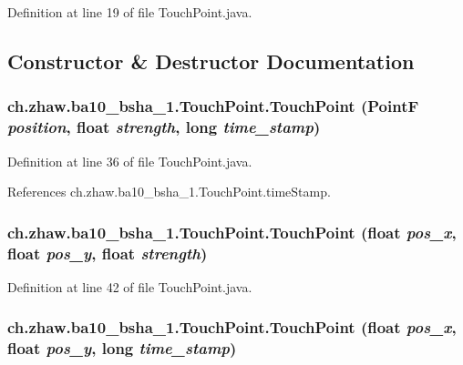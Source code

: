 Definition at line 19 of file TouchPoint.java.

\subsection{Constructor \& Destructor Documentation}
\hypertarget{classch_1_1zhaw_1_1ba10__bsha__1_1_1TouchPoint_a78cfb1506a0081d1e3175fde400290de}{
\subsubsection[{TouchPoint}]{\setlength{\rightskip}{0pt plus 5cm}ch.zhaw.ba10\_\-bsha\_\-1.TouchPoint.TouchPoint (PointF {\em position}, \/  float {\em strength}, \/  long {\em time\_\-stamp})}}
\label{classch_1_1zhaw_1_1ba10__bsha__1_1_1TouchPoint_a78cfb1506a0081d1e3175fde400290de}


Definition at line 36 of file TouchPoint.java.

References ch.zhaw.ba10\_\-bsha\_\-1.TouchPoint.timeStamp.\hypertarget{classch_1_1zhaw_1_1ba10__bsha__1_1_1TouchPoint_a56ef62d0be5dbcd46be0d65ea13e48b3}{
\subsubsection[{TouchPoint}]{\setlength{\rightskip}{0pt plus 5cm}ch.zhaw.ba10\_\-bsha\_\-1.TouchPoint.TouchPoint (float {\em pos\_\-x}, \/  float {\em pos\_\-y}, \/  float {\em strength})}}
\label{classch_1_1zhaw_1_1ba10__bsha__1_1_1TouchPoint_a56ef62d0be5dbcd46be0d65ea13e48b3}


Definition at line 42 of file TouchPoint.java.\hypertarget{classch_1_1zhaw_1_1ba10__bsha__1_1_1TouchPoint_ad3f4dd64b5c48581bd65cd2d777a1b96}{
\subsubsection[{TouchPoint}]{\setlength{\rightskip}{0pt plus 5cm}ch.zhaw.ba10\_\-bsha\_\-1.TouchPoint.TouchPoint (float {\em pos\_\-x}, \/  float {\em pos\_\-y}, \/  long {\em time\_\-stamp})}}
\label{classch_1_1zhaw_1_1ba10__bsha__1_1_1TouchPoint_ad3f4dd64b5c48581bd65cd2d777a1b96}


